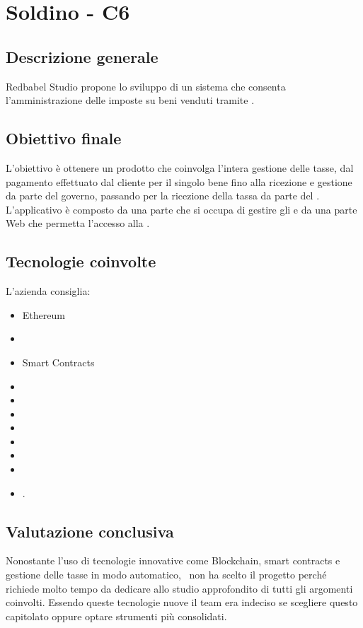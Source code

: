 \section{Soldino - C6} \label{c6}
    \subsection{Descrizione generale}
    Redbabel Studio propone lo sviluppo di un sistema che consenta l'amministrazione delle  imposte su beni venduti tramite .
    \subsection{Obiettivo finale}

    L'obiettivo è ottenere un prodotto che coinvolga l'intera gestione delle tasse, dal pagamento effettuato dal cliente per il singolo bene
    fino alla ricezione e gestione da parte del governo, passando per la ricezione della tassa da parte del .
    L'applicativo è composto da una parte che si occupa di gestire gli  e da una parte Web che permetta l'accesso alla .

    \subsection{Tecnologie coinvolte}
	L'azienda consiglia:
    	\begin{itemize}
        \item Ethereum
		\item {}
        \item Smart Contracts
		\item {}
		\item {}
		\item {}
		\item {}
        \item {}
        \item {}
        \item {}
        \item {}.
	\end{itemize}

    \subsection{Valutazione conclusiva}
    Nonostante l'uso di tecnologie innovative come Blockchain, smart contracts e gestione delle tasse in modo automatico, \gruppo\ non ha scelto
    il progetto perché richiede molto tempo da dedicare allo studio approfondito di tutti gli argomenti coinvolti.
    Essendo queste tecnologie nuove il team era indeciso se scegliere questo capitolato oppure optare strumenti più consolidati.